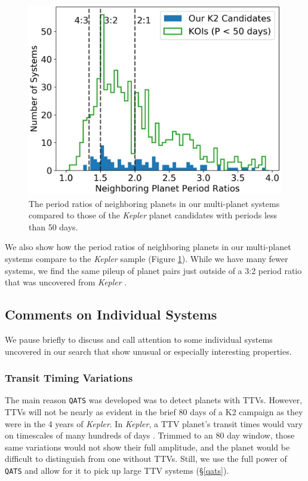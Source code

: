 \documentclass[twocolumn]{aastex62}
\newcommand{\project}[1]{\textsl{#1}}
\newcommand{\pipeline}[1]{\texttt{#1}}
\begin{document}
\begin{figure}[tbp]
\includegraphics[width=\columnwidth]{candidate_period_ratios_bw.png}
\caption{The period ratios of neighboring planets in our multi-planet
  systems compared to those of the \project{Kepler} planet candidates
  with periods less than 50 days. \label{periodratios}}
\end{figure}

We also show how the period ratios of neighboring planets in our
multi-planet systems compare to the \project{Kepler} sample (Figure
\ref{periodratios}). While we have many fewer systems, we find the
same pileup of planet pairs just outside of a 3:2 period ratio that
was uncovered from \project{Kepler} \citep{lis11b, fab14}.


\subsection{Comments on Individual Systems}

We pause briefly to discuss and call attention to some individual
systems uncovered in our search that show unusual or especially
interesting properties.


\subsubsection{Transit Timing Variations}
\label{sec:ttvs}

The main reason \pipeline{QATS} was developed was to detect planets
with TTVs. However, TTVs will not be nearly as evident in the brief 80
days of a K2 campaign as they were in the 4 years of
\project{Kepler}. In \project{Kepler}, a TTV planet's transit times
would vary on timescales of many hundreds of days
\citep{maz13}. Trimmed to an 80 day window, those same variations
would not show their full amplitude, and the planet would be difficult
to distinguish from one without TTVs. Still, we use the full power of
\pipeline{QATS} and allow for it to pick up large TTV systems
(\S\ref{qats}).
\end{document}
